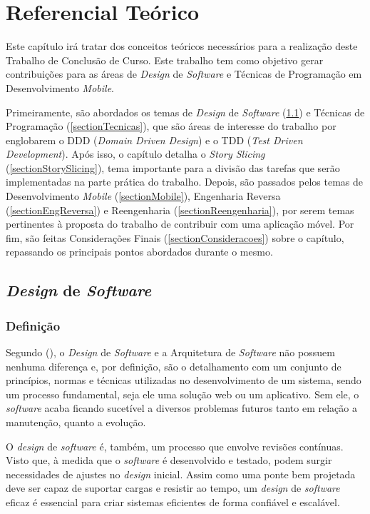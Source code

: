 \chapter[Referencial Teórico]{Referencial Teórico}
\label{cap:referencial}

Este capítulo irá tratar dos conceitos teóricos necessários para a realização deste 
Trabalho de Conclusão de Curso. Este trabalho tem como objetivo gerar contribuições 
para as áreas de \textit{Design} de \textit{Software} e Técnicas de Programação em Desenvolvimento \textit{Mobile}.

Primeiramente, são abordados os temas de \textit{Design} de \textit{Software} (\ref{sectionDesign}) e Técnicas de Programação (\ref{sectionTecnicas}), 
que são áreas de interesse do trabalho por englobarem o DDD (\textit{Domain Driven Design}) e o TDD 
(\textit{Test Driven Development}). Após isso, o capítulo detalha o \textit{Story Slicing} (\ref{sectionStorySlicing}), tema  
importante para a divisão das tarefas que serão implementadas na parte prática do trabalho.
Depois, são passados pelos temas de Desenvolvimento \textit{Mobile} (\ref{sectionMobile}), 
Engenharia Reversa (\ref{sectionEngReversa}) e Reengenharia (\ref{sectionReengenharia}), por serem temas pertinentes à proposta do trabalho de 
contribuir com uma aplicação móvel. Por fim, são feitas Considerações Finais (\ref{sectionConsideracoes}) sobre o capítulo, 
repassando os principais pontos abordados durante o mesmo.

\section{\textit{Design} de \textit{Software} }
\label{sectionDesign}

\subsection{Definição}

Segundo  (\citeyear{robert2019clean}), o \textit{Design} de \textit{Software} e 
a Arquitetura de \textit{Software} não possuem nenhuma diferença e, por definição, são o detalhamento com um conjunto 
de princípios, normas e técnicas utilizadas no desenvolvimento de um sistema, sendo um processo fundamental, 
seja ele uma solução web ou um aplicativo. Sem ele, o \textit{software} acaba ficando sucetível a diversos 
problemas futuros tanto em relação a manutenção, quanto a evolução.

O \textit{design} de \textit{software} é, também, um processo que envolve revisões contínuas. 
Visto que, à medida que o \textit{software} é desenvolvido e testado, podem surgir necessidades 
de ajustes no \textit{design} inicial. Assim como uma ponte bem projetada deve ser capaz de 
suportar cargas e resistir ao tempo, um \textit{design} de \textit{software} eficaz é essencial 
para criar sistemas eficientes de forma confiável e escalável.

